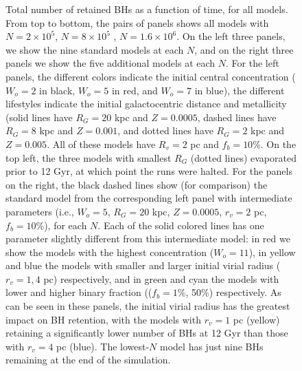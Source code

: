 \documentclass[12pt,preprint]{aastex}
\begin{document}
\begin{figure}[!h]

	\caption{Total number of retained BHs as a function of time, for all models.
	 From top to bottom, the pairs of panels shows all models with $N=2 \times 10^5$, 
	 $N=8 \times 10^5$ , $N=1.6 \times 10^6$. On the left three panels, we show the nine 
	 standard models at each $N$, and on the right three panels we show the five additional 
	 models at each $N$. For the left panels, the different colors indicate the initial central 
	 concentration ($W_o=2$ in black, $W_o=5$ in red, and $W_o=7$ in blue), the different
	 lifestyles indicate the initial galactocentric distance and metallicity (solid lines have 
	 $R_G=20$ kpc and $Z=0.0005$, dashed lines have $R_G=8$ kpc and $Z=0.001$,
	 and dotted lines have $R_G=2$ kpc and $Z=0.005$. All of these models have 
	 $R_v=2$ pc and $f_b=10$\%. On the top left, the three models with smallest $R_G$ 
	 (dotted lines) evaporated prior to 12 Gyr, at which point the runs were halted.
	 For the panels on the right, the
	 black dashed lines show (for comparison) the standard model from the corresponding
	 left panel with intermediate parameters (i.e., $W_o=5$, $R_G=20$ kpc, $Z=0.0005$, 
	 $r_v=2$ pc, $f_b=10$\%), for each $N$. Each of the solid colored lines has one parameter 
	 slightly different from this intermediate model: in red we show the models with the highest 
	 concentration ($W_o=11$), in yellow and blue the models with smaller and larger 
	 initial virial radius ($r_v = 1, 4$ pc) respectively, and in green and cyan the models 
	 with lower and higher binary fraction (($f_b=1$\%, 50\%) respectively. As can be seen
	 in these panels, the initial virial radius has the greatest impact on BH retention, with
	 the models with $r_v=1$ pc (yellow) retaining a significantly lower number of
	 BHs at 12 Gyr than those with $r_v=4$ pc (blue). The lowest-$N$ model has just nine 
	 BHs remaining at the end of the simulation.}

	\label{fig:bhs_vs_time}
\end{figure}





\end{document}
